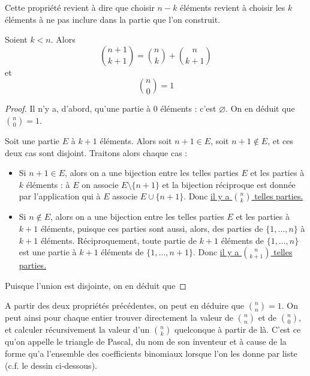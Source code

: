 Cette propriété revient à dire que choisir $n-k$ éléments revient à choisir les $k$ éléments à ne pas inclure dans la partie que l'on construit.

\begin{prop}
    Soient $k< n$. Alors $$\binom{n+1}{k+1}=\binom{n}{k}+\binom{n}{k+1}$$ et $$\binom{n}{0}=1$$
\end{prop}
\begin{proof}
    Il n'y a, d'abord, qu'une partie à $0$ éléments : c'est $\varnothing$. On en déduit que \underline{$\displaystyle{\binom{n}{0}=1}$}.
    
    Soit une partie $E$ à $k+1$ éléments. Alors soit $n+1\in E$, soit $n+1\notin E$, et ces deux cas sont disjoint. Traitons alors chaque cas :
    \begin{itemize}[label=$\bullet$]
        \item Si $n+1\in E$, alors on a une bijection entre les telles parties $E$ et les parties à $k$ éléments : à $E$ on associe $E\setminus \{n+1\}$ et la bijection réciproque est donnée par l'application qui à $E$ associe $E\cup\{n+1\}$. Donc \underline{il y a $\displaystyle{\binom{n}{k}}$ telles parties.}
        \item Si $n\notin E$, alors on a une bijection entre les telles parties $E$ et les parties à $k+1$ éléments, puisque ces parties sont aussi, alors, des parties de $\{1,\ldots,n\}$ à $k+1$ éléments. Réciproquement, toute partie de $k+1$ éléments de $\{1,\ldots,n\}$ est une partie à $k+1$ éléments de $\{1,\ldots,n+1\}$. Donc \underline{il y a $\displaystyle{\binom{n}{k+1}}$ telles parties.}
    \end{itemize}
    
    Puisque l'union est disjointe, on en déduit que 
\end{proof}

\begin{rmk}
    A partir des deux propriétés précédentes, on peut en déduire que $\displaystyle{\binom{n}{n}=1}$. On peut ainsi pour chaque entier trouver directement la valeur de $\displaystyle{\binom{n}{n}}$ et de $\displaystyle{\binom{n}{0}}$, et calculer récursivement la valeur d'un $\displaystyle{\binom{n}{k}}$ quelconque à partir de là. C'est ce qu'on appelle le triangle de Pascal, du nom de son inventeur et à cause de la forme qu'a l'ensemble des coefficients binomiaux lorsque l'on les donne par liste (c.f. le dessin ci-dessous).
\end{rmk}

